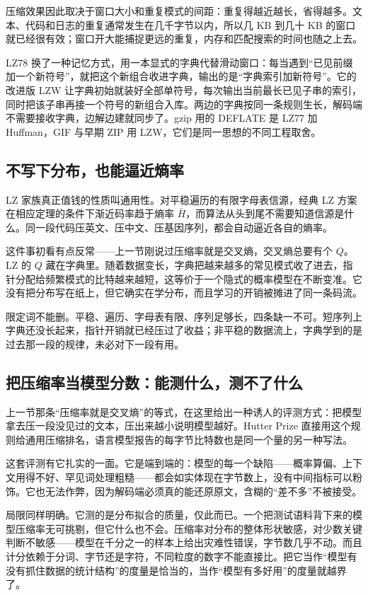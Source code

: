 压缩效果因此取决于窗口大小和重复模式的间距：重复得越近越长，省得越多。文本、代码和日志的重复通常发生在几千字节以内，所以几 KB 到几十 KB 的窗口就已经很有效；窗口开大能捕捉更远的重复，内存和匹配搜索的时间也随之上去。

LZ78 换了一种记忆方式，用一本显式的字典代替滑动窗口：每当遇到``已见前缀加一个新符号''，就把这个新组合收进字典，输出的是``字典索引加新符号''。它的改进版 LZW 让字典初始就装好全部单符号，每次输出当前最长已见子串的索引，同时把该子串再接一个符号的新组合入库。两边的字典按同一条规则生长，解码端不需要接收字典，边解边建就同步了。gzip 用的 DEFLATE 是 LZ77 加 Huffman，GIF 与早期 ZIP 用 LZW，它们是同一思想的不同工程取舍。

\subsection{不写下分布，也能逼近熵率}

LZ 家族真正值钱的性质叫通用性。对平稳遍历的有限字母表信源，经典 LZ 方案在相应定理的条件下渐近码率趋于熵率 \(\bar H\)，而算法从头到尾不需要知道信源是什么。同一段代码压英文、压中文、压基因序列，都会自动逼近各自的熵率。

这件事初看有点反常——上一节刚说过压缩率就是交叉熵，交叉熵总要有个 \(Q\)。LZ 的 \(Q\) 藏在字典里。随着数据变长，字典把越来越多的常见模式收了进去，指针分配给频繁模式的比特越来越短，这等价于一个隐式的概率模型在不断变准。它没有把分布写在纸上，但它确实在学分布，而且学习的开销被摊进了同一条码流。

限定词不能删。平稳、遍历、字母表有限、序列足够长，四条缺一不可。短序列上字典还没长起来，指针开销就已经压过了收益；非平稳的数据流上，字典学到的是过去那一段的规律，未必对下一段有用。

\subsection{把压缩率当模型分数：能测什么，测不了什么}

上一节那条``压缩率就是交叉熵''的等式，在这里给出一种诱人的评测方式：把模型拿去压一段没见过的文本，压出来越小说明模型越好。Hutter Prize 直接用这个规则给通用压缩排名，语言模型报告的每字节比特数也是同一个量的另一种写法。

这套评测有它扎实的一面。它是端到端的：模型的每一个缺陷——概率算偏、上下文用得不好、罕见词处理粗糙——都会如实体现在字节数上，没有中间指标可以粉饰。它也无法作弊，因为解码端必须真的能还原原文，含糊的``差不多''不被接受。

局限同样明确。它测的是分布拟合的质量，仅此而已。一个把测试语料背下来的模型压缩率无可挑剔，但它什么也不会。压缩率对分布的整体形状敏感，对少数关键判断不敏感——模型在千分之一的样本上给出灾难性错误，字节数几乎不动。而且计分依赖于分词、字节还是字符，不同粒度的数字不能直接比。把它当作``模型有没有抓住数据的统计结构''的度量是恰当的，当作``模型有多好用''的度量就越界了。

